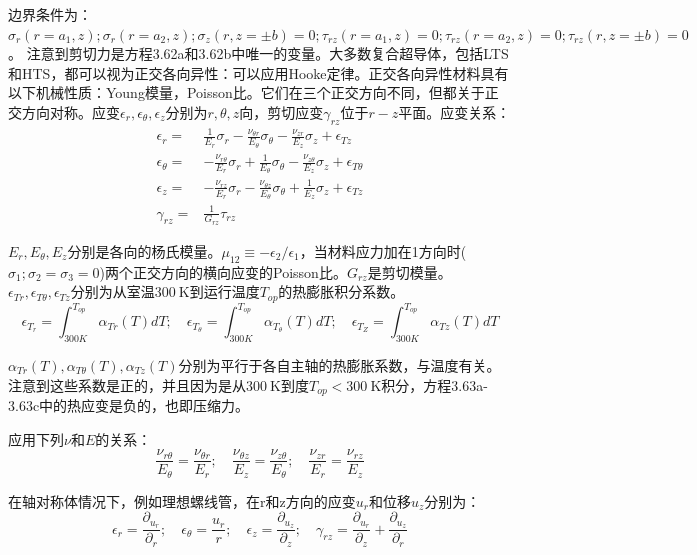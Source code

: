 边界条件为：$\sigma_r(r=a_1,z);\sigma_r(r=a_2,z);\sigma_z(r,z=\pm b)=0;\tau_{rz}(r=a_1,z)=0;\tau_{rz}(r=a_2,z)=0;\tau_{rz}(r,z=\pm b)=0$。
注意到剪切力是方程3.62a和3.62b中唯一的变量。大多数复合超导体，包括LTS和HTS，都可以视为正交各向异性：可以应用Hooke定律。正交各向异性材料具有以下机械性质：Young模量，Poisson比。它们在三个正交方向不同，但都关于正交方向对称。应变$\epsilon_r,\epsilon_\theta,\epsilon_z$分别为$r,\theta,z$向，剪切应变$\gamma_{rz}$位于$r-z$平面。应变关系：
\begin{subequations}
	\begin{align}
\epsilon_r=&\frac{1}{E_r}\sigma_r-\frac{\nu_{\theta r}}{E_{\theta}}\sigma_{\theta}-\frac{\nu_{zr}}{E_z}\sigma_z+\epsilon_{Tz}\\
\epsilon_\theta=&-\frac{\nu_{r\theta}}{E_r}\sigma_r+\frac{1}{E_{\theta}}\sigma_{\theta}-\frac{\nu_{z\theta}}{E_z}\sigma_z+\epsilon_{T\theta}\\
\epsilon_z=&-\frac{\nu_{rz}}{E_r}\sigma_r-\frac{\nu_{\theta z}}{E_{\theta}}\sigma_{\theta}+\frac{1}{E_z}\sigma_z+\epsilon_{Tz}\\
\gamma_{rz}=&\frac{1}{G_{{rz}}}\tau_{rz}
	\end{align}
\end{subequations}

$E_r, E_\theta, E_z$分别是各向的杨氏模量。$\mu_{12}\equiv -\epsilon_2/\epsilon_1$，当材料应力加在1方向时($\sigma_1;\sigma_2=\sigma_3=0$)两个正交方向的横向应变的Poisson比。$G_{rz}$是剪切模量。 
$\epsilon_{Tr},\epsilon_{T\theta},\epsilon_{Tz}$分别为从室温$300\ \mathrm{K}$到运行温度$T_{op}$的热膨胀积分系数。
\begin{equation*}
\epsilon_{T_r}=\int_{300K}^{T_{op}}\alpha_{Tr}(T)dT;\quad
\epsilon_{T_\theta}=\int_{300K}^{T_{op}}\alpha_{T_\theta}(T)dT;\quad
\epsilon_{T_Z}=\int_{300K}^{T_{op}}\alpha_{Tz}(T)dT \tag{3.63e}
\end{equation*}

$\alpha_{Tr}(T),\alpha_{T\theta}(T),\alpha_{Tz}(T)$分别为平行于各自主轴的热膨胀系数，与温度有关。
注意到这些系数是正的，并且因为是从$300\ \mathrm{K}$到度$T_{op}<300\ \mathrm{K}$积分，方程3.63a-3.63c中的热应变是负的，也即压缩力。

应用下列$\nu$和$E$的关系：
\begin{equation*}
\frac{\nu_{r\theta}}{E_\theta}=\frac{\nu_{\theta r}}{E_r};\quad \frac{\nu_{\theta z}}{E_z}=\frac{\nu_{z\theta}}{E_\theta};\quad \frac{\nu_{zr}}{E_r}=\frac{\nu_{rz}}{E_z} \tag{3.63f}
\end{equation*}

在轴对称体情况下，例如理想螺线管，在r和z方向的应变$u_r$和位移$u_z$分别为：
\begin{equation*}
\epsilon_r=\frac{\partial_{u_r}}{\partial_r};\quad \epsilon_\theta=\frac{u_r}{r};\quad \epsilon_z=\frac{\partial_{u_z}}{\partial_z};\quad \gamma_{rz}=\frac{\partial_{u_r}}{\partial_z}+\frac{\partial_{u_z}}{\partial_r} \tag{3.63g}
\end{equation*}

